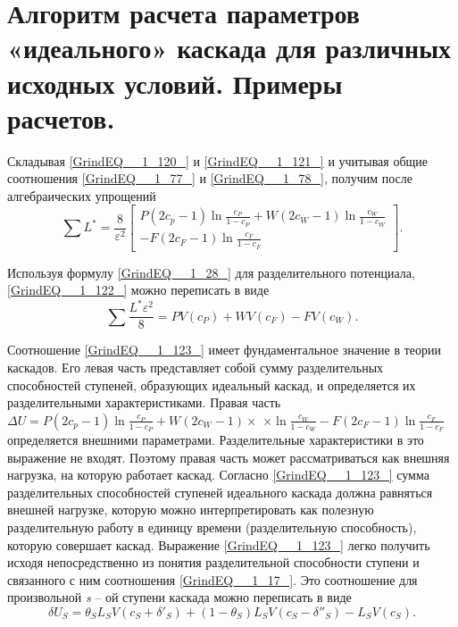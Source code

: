 \section{Алгоритм расчета параметров «идеального» каскада для различных исходных условий. Примеры расчетов.}


Складывая \ref{GrindEQ__1_120_} и \ref{GrindEQ__1_121_} и учитывая общие соотношения \ref{GrindEQ__1_77_} и \ref{GrindEQ__1_78_}, получим после алгебраических упрощений
\begin{equation} \label{GrindEQ__1_122_} 
\sum L^{*}  =\frac{8}{\varepsilon ^{2} } \left[\begin{array}{l} {P(2c_{p} -1)\ln \frac{c_{P} }{1-c_{P} } +W(2c_{W} -1)\ln \frac{c_{W} }{1-c_{W} } } \\ {-F(2c_{F} -1)\ln \frac{c_{F} }{1-c_{F} } } \end{array}\right].              
\end{equation} 

Используя формулу \ref{GrindEQ__1_28_} для разделительного потенциала, \ref{GrindEQ__1_122_} можно переписать в виде
\begin{equation} \label{GrindEQ__1_123_} 
\sum \frac{L^{*} \varepsilon ^{2} }{8} =PV(c_{P} )+WV(c_{F} )-FV(c_{W} ) .                 
\end{equation} 

Соотношение \ref{GrindEQ__1_123_} имеет фундаментальное значение в теории каскадов. Его левая часть представляет собой сумму разделительных способностей ступеней, образующих идеальный каскад, и определяется их разделительными характеристиками. Правая часть $\Delta U=P(2c_{p} -1)\ln \frac{c_{P} }{1-c_{P} } +W(2c_{W} -1)\times $ $\times \ln \frac{c_{W} }{1-c_{W} } -F(2c_{F} -1)\ln \frac{c_{F} }{1-c_{F} } $ определяется внешними параметрами. Разделительные характеристики в это выражение не входят. Поэтому правая часть может рассматриваться как внешняя нагрузка, на которую работает каскад. Согласно \ref{GrindEQ__1_123_} сумма разделительных способностей ступеней идеального каскада должна равняться внешней нагрузке, которую можно интерпретировать как полезную разделительную работу в единицу времени (разделительную способность), которую совершает каскад. Выражение \ref{GrindEQ__1_123_} легко получить исходя непосредственно из понятия разделительной способности ступени и связанного с ним соотношения \ref{GrindEQ__1_17_}. Это соотношение для произвольной \textit{s} -- ой ступени каскада можно переписать в виде
\begin{equation} \label{GrindEQ__1_124_} 
\delta U_{S} =\theta _{S} L_{S} V(c_{S} +\delta '_{S} )+(1-\theta _{S} )L_{S} V(c_{S} -\delta ''_{S} )-L_{S} V(c_{S} ).         
\end{equation} 

